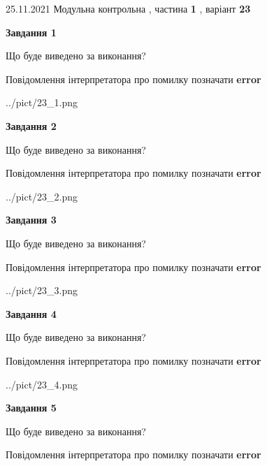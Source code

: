 \documentclass[10pt, ukrainian]{article}
\begin{document}
{25.11.2021 Модульна контрольна , частина \textbf { 1 }, варіант  \No \textbf { 23 }\par}
{
\begin {large}

{\begin {center}\textbf{Завдання 1}\end {center}}\par
Що буде виведено за виконання? \par
Повідомлення інтерпретатора про помилку позначати \textbf{error}

\begin{center}
	{../pict/23_1.png}
\end{center}
\newpage

{\begin {center}\textbf{Завдання 2}\end {center}}\par
Що буде виведено за виконання? \par
Повідомлення інтерпретатора про помилку позначати \textbf{error}

\begin{center}
	{../pict/23_2.png}
\end{center}
\newpage

{\begin {center}\textbf{Завдання 3}\end {center}}\par
Що буде виведено за виконання? \par
Повідомлення інтерпретатора про помилку позначати \textbf{error}

\begin{center}
	{../pict/23_3.png}
\end{center}
\newpage

{\begin {center}\textbf{Завдання 4}\end {center}}\par
Що буде виведено за виконання? \par
Повідомлення інтерпретатора про помилку позначати \textbf{error}

\begin{center}
	{../pict/23_4.png}
\end{center}
\newpage

{\begin {center}\textbf{Завдання 5}\end {center}}\par
Що буде виведено за виконання? \par
Повідомлення інтерпретатора про помилку позначати \textbf{error}


\end{large}}
\end{document}
